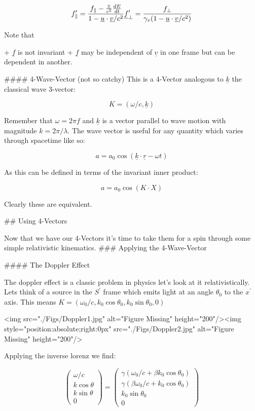 $$
f^\prime_{\parallel} = \frac{f_\parallel - \frac{\underline{v}}{c^2}\frac{dE}{dt}}{1-\underline{u}\cdot\underline{v}/c^2}\\
\underline{f}^\prime_\perp = \frac{f_\perp}{\gamma_v(1-\underline{u}\cdot\underline{v}/c^2)}
$$

Note that

+ $\underline{f}$ is not invariant
+ $\underline{f}$ may be independent of $\underline{v}$ in one frame but can be dependent in another.

#### 4-Wave-Vector (not so catchy)
This is a 4-Vector analogous to $\underline{k}$ the classical wave 3-vector:

$$
K = (\omega/c, \underline{k})
$$

Remember that $\omega = 2\pi f$ and $\underline{k}$ is a vector parallel to wave motion with magnitude $k = 2\pi/\lambda$. The wave vector is useful for any quantity which varies through spacetime like so:

$$
a = a_0\cos(\underline{k}\cdot\underline{r} - \omega t)
$$

As this can be defined in terms of the invariant inner product:

$$
a = a_0\cos(K\cdot X)
$$

Clearly these are equivalent.

## Using 4-Vectors

Now that we have our 4-Vectors it's time to take them for a spin through some simple relativistic kinematics.
### Applying the 4-Wave-Vector

#### The Doppler Effect

The doppler effect is a classic problem in physics let's look at it relativistically. Lets think of a source in the $S^\prime$ frame which emits light at an angle $\theta_0$ to the $x^\prime$ axis. This means $K=(\omega_0/c, k_0\cos\theta_0, k_0\sin\theta_0, 0)$

<img src="./Figs/Doppler1.jpg" alt="Figure Missing" height="200"/><img style="position:absolute;right:0px" src="./Figs/Doppler2.jpg" alt="Figure Missing" height="200"/>

Applying the inverse lorenz we find:

$$
\begin{pmatrix}
    \omega/c\\
    k\cos\theta\\
    k\sin\theta\\
    0
\end{pmatrix} =
\begin{pmatrix}
    \gamma(\omega_0/c + \beta k_0\cos\theta_0)\\
    \gamma(\beta\omega_0/c + k_0\cos\theta_0)\\
    k_0\sin\theta_0\\
    0
\end{pmatrix}
$$

